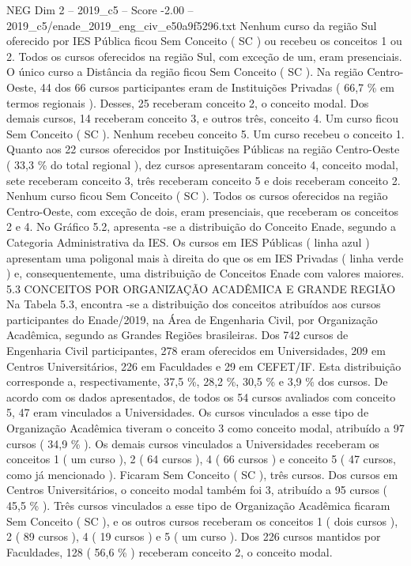 \begin{textsample}{NEG Dim 2 – 2019\_c5 – Score -2.00 – 2019\_c5/enade\_2019\_eng\_civ\_e50a9f5296.txt}
Nenhum curso da região Sul oferecido por IES Pública ficou Sem Conceito ( SC ) ou recebeu os conceitos 1 ou 2.
Todos os cursos oferecidos na região Sul, com exceção de um, eram presenciais.
O único curso a Distância da região ficou Sem Conceito ( SC ).
Na região Centro-Oeste, 44 dos 66 cursos participantes eram de Instituições Privadas ( 66,7 \% em termos regionais ).
Desses, 25 receberam conceito 2, o conceito modal.
Dos demais cursos, 14 receberam conceito 3, e outros três, conceito 4.
Um curso ficou Sem Conceito ( SC ).
Nenhum recebeu conceito 5.
Um curso recebeu o conceito 1.
Quanto aos 22 cursos oferecidos por Instituições Públicas na região Centro-Oeste ( 33,3 \% do total regional ), dez cursos apresentaram conceito 4, conceito modal, sete receberam conceito 3, três receberam conceito 5 e dois receberam conceito 2.
Nenhum curso ficou Sem Conceito ( SC ).
Todos os cursos oferecidos na região Centro-Oeste, com exceção de dois, eram presenciais, que receberam os conceitos 2 e 4.
No Gráfico 5.2, apresenta -se a distribuição do Conceito Enade, segundo a Categoria Administrativa da IES.
Os cursos em IES Públicas ( linha azul ) apresentam uma poligonal mais à direita do que os em IES Privadas ( linha verde ) e, consequentemente, uma distribuição de Conceitos Enade com valores maiores. 5.3 CONCEITOS POR ORGANIZAÇÃO ACADÊMICA E GRANDE REGIÃO Na Tabela 5.3, encontra -se a distribuição dos conceitos atribuídos aos cursos participantes do Enade/2019, na Área de Engenharia Civil, por Organização Acadêmica, segundo as Grandes Regiões brasileiras.
Dos 742 cursos de Engenharia Civil participantes, 278 eram oferecidos em Universidades, 209 em Centros Universitários, 226 em Faculdades e 29 em CEFET/IF.
Esta distribuição corresponde a, respectivamente, 37,5 \%, 28,2 \%, 30,5 \% e 3,9 \% dos cursos.
De acordo com os dados apresentados, de todos os 54 cursos avaliados com conceito 5, 47 eram vinculados a Universidades.
Os cursos vinculados a esse tipo de Organização Acadêmica tiveram o conceito 3 como conceito modal, atribuído a 97 cursos ( 34,9 \% ).
Os demais cursos vinculados a Universidades receberam os conceitos 1 ( um curso ), 2 ( 64 cursos ), 4 ( 66 cursos ) e conceito 5 ( 47 cursos, como já mencionado ).
Ficaram Sem Conceito ( SC ), três cursos.
Dos cursos em Centros Universitários, o conceito modal também foi 3, atribuído a 95 cursos ( 45,5 \% ).
Três cursos vinculados a esse tipo de Organização Acadêmica ficaram Sem Conceito ( SC ), e os outros cursos receberam os conceitos 1 ( dois cursos ), 2 ( 89 cursos ), 4 ( 19 cursos ) e 5 ( um curso ).
Dos 226 cursos mantidos por Faculdades, 128 ( 56,6 \% ) receberam conceito 2, o conceito modal.

\end{textsample}

